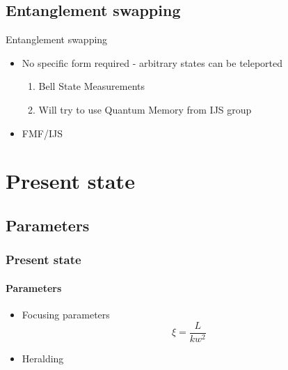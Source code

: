 \documentclass[serif,8pt]{beamer}
\begin{document}
{{\subsection{Entanglement swapping}
\begin{frame}{Entanglement swapping}
	\begin{itemize}
		\item No specific form required - arbitrary states can be teleported
			\begin{enumerate}
				\item Bell State Measurements
				\item Will try to use Quantum Memory from IJS group
			\end{enumerate}
		\item FMF/IJS
	\end{itemize}
\end{frame}

\section{Present state}

\subsection{Parameters}
\begin{frame}[t]
	\frametitle{Present state}
	\framesubtitle{Parameters}
		\begin{itemize}
			\item Focusing parameters \cite{bennik}
					\begin{equation}
							\xi = \frac{L}{k w^2}
						\label{eq:Focusing parameter}
					\end{equation}
			\item Heralding
		\end{itemize}
\end{frame}

}}
\end{document}
